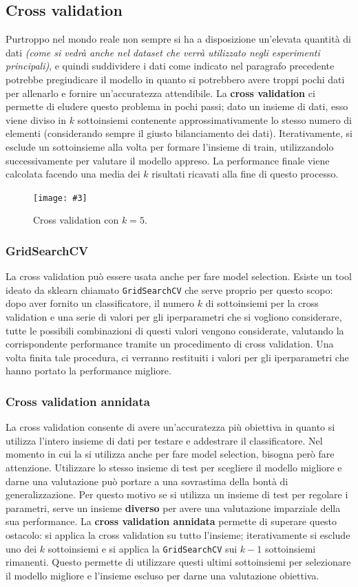 \documentclass[12pt, twoside, letterpaper]{report}
\newcommand{\img}[4] {
	\begin{figure}
		\centering
		\texttt{[image: \#3]}\\
		\caption{#1}
		\label{fig:#4}
	\end{figure}
}
\begin{document}
			\subsection{Cross validation}
				Purtroppo nel mondo reale non sempre si ha a disposizione un'elevata quantità di dati \textit{(come si vedrà anche nel dataset che verrà utilizzato negli esperimenti principali)}, e quindi suddividere i dati come indicato nel paragrafo precedente potrebbe pregiudicare il modello in quanto si potrebbero avere troppi pochi dati per allenarlo e fornire un'accuratezza attendibile. La \textbf{cross validation} ci permette di eludere questo problema in pochi passi; dato un insieme di dati, esso viene diviso in $k$ sottoinsiemi contenente approssimativamente lo stesso numero di elementi (considerando sempre il giusto bilanciamento dei dati). Iterativamente, si esclude un sottoinsieme alla volta per formare l'insieme di train, utilizzandolo successivamente per valutare il modello appreso. La performance finale viene calcolata facendo una media dei $k$ risultati ricavati alla fine di questo processo. 
				\img{Cross validation con $k = 5$.}{0.5}{cv.png}{cv}
				
				\subsubsection{GridSearchCV}
					La cross validation può essere usata anche per fare model selection. Esiste un tool ideato da sklearn \cite{sklearn} chiamato \texttt{GridSearchCV} che serve proprio per questo scopo: dopo aver fornito un classificatore, il numero $k$ di sottoinsiemi per la cross validation e una serie di valori per gli iperparametri che si vogliono considerare, tutte le possibili combinazioni di questi valori vengono considerate, valutando la corrispondente performance tramite un procedimento di cross validation. Una volta finita tale procedura, ci verranno restituiti i valori per gli iperparametri che hanno portato la performance migliore.
				
				\subsubsection{Cross validation annidata}	
					La cross validation consente di avere un'accuratezza più obiettiva in quanto si utilizza l'intero insieme di dati per testare e addestrare il classificatore. Nel momento in cui la si utilizza anche per fare model selection, bisogna però fare attenzione. Utilizzare lo stesso insieme di test per scegliere il modello migliore e darne una valutazione può portare a una sovrastima della bontà di generalizzazione. Per questo motivo se si utilizza un insieme di test per regolare i parametri, serve un insieme \textbf{diverso} per avere una valutazione imparziale della sua performance. La \textbf{cross validation annidata} permette di superare questo ostacolo: si applica la cross validation su tutto l'insieme; iterativamente si esclude uno dei $k$ sottoinsiemi e si applica la \texttt{GridSearchCV} sui $k-1$ sottoinsiemi rimanenti. Questo permette di utilizzare questi ultimi sottoinsiemi per selezionare il modello migliore e l'insieme escluso per darne una valutazione obiettiva.
				
\end{document}

